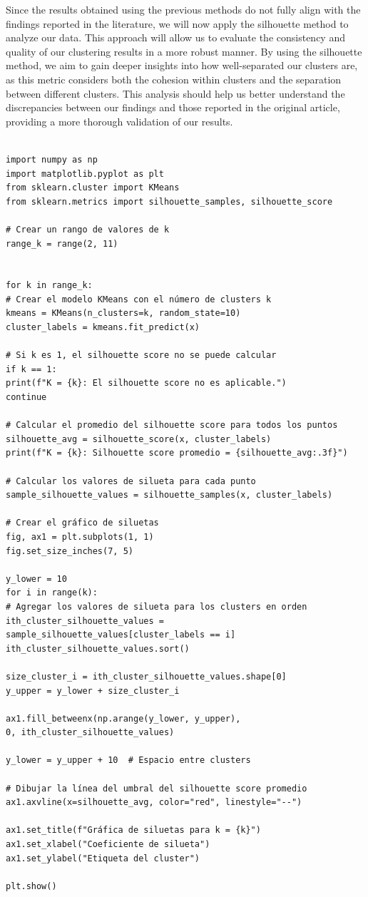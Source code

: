 \documentclass{article}
\begin{document}
Since the results obtained using the previous methods do not fully align with the findings reported in the literature, we will now apply the silhouette method to analyze our data. This approach will allow us to evaluate the consistency and quality of our clustering results in a more robust manner. By using the silhouette method, we aim to gain deeper insights into how well-separated our clusters are, as this metric considers both the cohesion within clusters and the separation between different clusters. This analysis should help us better understand the discrepancies between our findings and those reported in the original article, providing a more thorough validation of our results.
\begin{lstlisting}[style=mypython, label=fig:pca_code,caption=Application of PCA method]
	
import numpy as np
import matplotlib.pyplot as plt
from sklearn.cluster import KMeans
from sklearn.metrics import silhouette_samples, silhouette_score

# Crear un rango de valores de k
range_k = range(2, 11)


for k in range_k:
# Crear el modelo KMeans con el número de clusters k
kmeans = KMeans(n_clusters=k, random_state=10)
cluster_labels = kmeans.fit_predict(x)

# Si k es 1, el silhouette score no se puede calcular
if k == 1:
print(f"K = {k}: El silhouette score no es aplicable.")
continue

# Calcular el promedio del silhouette score para todos los puntos
silhouette_avg = silhouette_score(x, cluster_labels)
print(f"K = {k}: Silhouette score promedio = {silhouette_avg:.3f}")

# Calcular los valores de silueta para cada punto
sample_silhouette_values = silhouette_samples(x, cluster_labels)

# Crear el gráfico de siluetas
fig, ax1 = plt.subplots(1, 1)
fig.set_size_inches(7, 5)

y_lower = 10
for i in range(k):
# Agregar los valores de silueta para los clusters en orden
ith_cluster_silhouette_values = sample_silhouette_values[cluster_labels == i]
ith_cluster_silhouette_values.sort()

size_cluster_i = ith_cluster_silhouette_values.shape[0]
y_upper = y_lower + size_cluster_i

ax1.fill_betweenx(np.arange(y_lower, y_upper),
0, ith_cluster_silhouette_values)

y_lower = y_upper + 10  # Espacio entre clusters

# Dibujar la línea del umbral del silhouette score promedio
ax1.axvline(x=silhouette_avg, color="red", linestyle="--")

ax1.set_title(f"Gráfica de siluetas para k = {k}")
ax1.set_xlabel("Coeficiente de silueta")
ax1.set_ylabel("Etiqueta del cluster")

plt.show()
\end{lstlisting}
\end{document}
